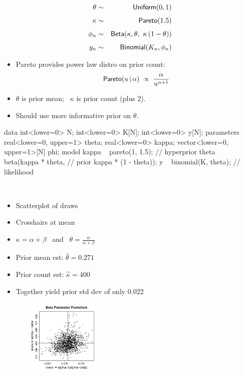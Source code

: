 \documentclass[10pt]{report}
\begin{document}
%
\begin{eqnarray*}
\theta &  \sim & \text{\sf Uniform}(0,1)
\\[4pt]
\kappa & \sim & \text{\sf Pareto}(1.5)
\\[4pt]
\phi_n & \sim & \text{\sf Beta}(\kappa, \theta, \ \kappa \, (1 - \theta))
\\[4pt]
y_n & \sim & \text{\sf Binomial}(K_n, \phi_n)
\end{eqnarray*}
\begin{itemize}
\item Pareto provides power law distro on prior count:
{\small
\[
\text{\sf Pareto}(u \, | \, \alpha)
\ \propto \
\frac{\alpha}
     {u^{\alpha + 1}}
\]
}
\item $\theta$ is prior mean; \ $\kappa$ is prior count (plus 2).
\item Should use more informative prior on $\theta$.
\end{itemize}


%
\begin{stancode}
data {
  int<lower=0> N;
  int<lower=0> K[N];
  int<lower=0> y[N];
}
parameters {
  real<lower=0, upper=1> theta;
  real<lower=0> kappa;
  vector<lower=0, upper=1>[N] phi;
}
model {
  kappa ~ pareto(1, 1.5);             // hyperprior
  theta ~ beta(kappa * theta,         // prior
               kappa * (1 - theta));
  y ~ binomial(K, theta);             // likelihood
}
\end{stancode}


%
\\[8pt]
\begin{minipage}[t]{0.55\textwidth}
\begin{itemize}
\item Scatterplot of draws
\item Crosshairs at mean
\item $\kappa = \alpha +
  \beta$ \ and \ $\theta = \frac{\alpha}{\alpha + \beta}$
\item Prior mean est: $\hat{\theta} = 0.271$
\item Prior count est: $\hat{\kappa} = 400$
\item Together yield prior std dev of only 0.022
\end{itemize}
\end{minipage}
\begin{minipage}[t]{0.45\textwidth}
\vfill
\mbox{ } \ \ \ \ \ \ \includegraphics[height=1.4in]{img/baseball-beta-posterior-scatter.png}
\vfill
\end{minipage}
\end{document}
